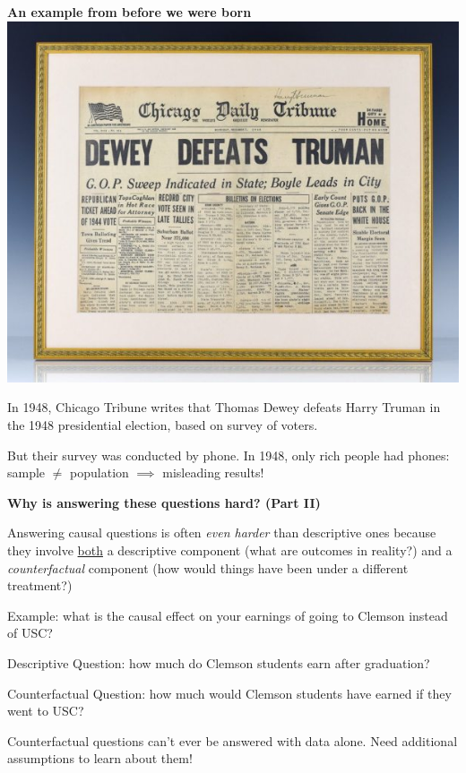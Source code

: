\documentclass[11pt, aspectratio=169]{beamer}
\newenvironment{wideitemize}{\itemize\addtolength{\itemsep}{5pt}}{\enditemize}
\begin{document}
\begin{frame}{\bf \large An example from before we were born }
\centering
\includegraphics[width = 0.4\linewidth]{figs/dewey-defeats-truman}
\begin{wideitemize}
	\item 
	In 1948, Chicago Tribune writes that Thomas Dewey defeats Harry Truman in the 1948 presidential election, based on survey of voters.
	
	\pause
	\item
	But their survey was conducted by phone. In 1948, only rich people had phones: sample $\neq$ population $\implies$ misleading results! 
\end{wideitemize}
\end{frame}


\begin{frame}{\bf \large Why is answering these questions hard? (Part II)}
\begin{wideitemize}
	\item
	Answering causal questions is often \textit{even harder} than descriptive ones because they involve \underline{both} a descriptive component (what are outcomes in reality?) and a \textit{counterfactual} component (how would things have been under a different treatment?)
	
	\pause
	\item
	Example: what is the causal effect on your earnings of going to Clemson instead of USC? 
		\begin{wideitemize}
			\item
			Descriptive Question: how much do Clemson students earn after graduation? 
			
			\item
			Counterfactual Question: how much would Clemson students have earned if they went to USC?  
		\end{wideitemize}
		

	\item Counterfactual questions can't ever be answered with data alone. Need additional assumptions to learn about them!	
\end{wideitemize}	
\end{frame}
\end{document}
